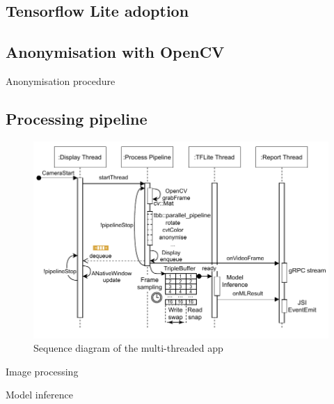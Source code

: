 \subsection{Tensorflow Lite adoption}

\subsection{Anonymisation with OpenCV} %

\begin{algorithm}[!ht]

\caption{Anonymisation procedure}
\label{algo:Anonymisation procedure}
\end{algorithm}

\subsection{Processing pipeline}

\begin{figure}[!ht]
    \centering
    \includegraphics[width=\textwidth]{implementation/imgs/4-model-infer.pdf}
    \caption{Sequence diagram of the multi-threaded app}
    \label{fig:4-model-infer}
\end{figure}
\begin{minipage}{.5\textwidth}
\begin{algorithm}[H]

\caption{Image processing}
\label{algo:Image processing}
\end{algorithm}
\end{minipage}
\vline
\begin{minipage}{.5\textwidth}
\begin{algorithm}[H]

\caption{Model inference}
\label{algo:Model inference}
\end{algorithm}
\end{minipage}
